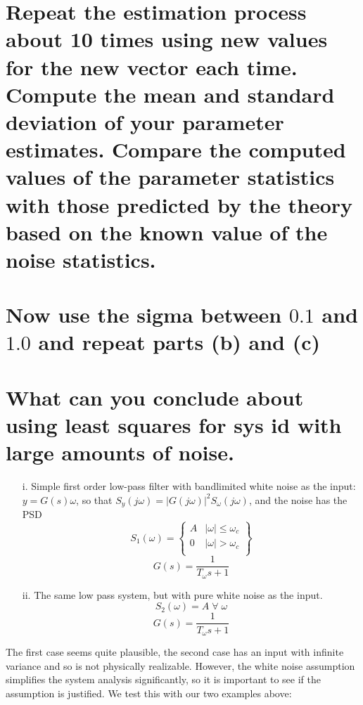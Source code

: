 \documentclass[12pt,letterpaper, onecolumn]{exam}
\begin{document}
\begin{questions}
\begin{parts}
        \part{Repeat the estimation process about 10 times using new values for the new vector each time. Compute the mean and standard deviation of your parameter estimates. Compare the computed values of the parameter statistics with those predicted by the theory based on the known value of the noise statistics.}
        \solution{}

        \part{Now use the sigma between $0.1$ and $1.0$ and repeat parts (b) and (c)}

        \solution{}

        \part{What can you conclude about using least squares for sys id with large amounts of noise.}

        \solution{}
    \end{parts}
    \clearpage
    \begin{itemize}
        \item[i.]{Simple first order low-pass filter with bandlimited white noise as the input:
        $y = G(s)\omega$, so that $S_y(j\omega) = \left\vert G(j\omega) \right\vert^2S_{\omega}(j\omega)$, and the noise has the PSD
        \[S_1(\omega) =
            \begin{Bmatrix}
                A & \vert \omega \vert \leq \omega_c \\
                0 & \vert \omega \vert > \omega_c    \\
            \end{Bmatrix} \]
        \[G(s) = \frac{1}{T_{\omega}s + 1} \]
        }
        \item[ii.]{The same low pass system, but with pure white noise as the input.
                    \[S_2(\omega) = A\;\forall\;\omega   \]
                    \[G(s) = \frac{1}{T_{\omega}s + 1} \]
              }
    \end{itemize}
    The first case seems quite plausible, the second case has an input with infinite variance and so is not physically realizable. However, the white noise assumption simplifies the system analysis significantly, so it is important to see if the assumption is justified. We test this with our two examples above:
    \begin{parts}

\end{parts}
\end{questions}
\end{document}
